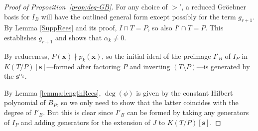 \documentclass[fleqn,reqno]{amsart}
\numberwithin{first}{chapter}
\begin{document}
\begin{proof}[Proof of Proposition~\ref{prop:deg-GB}]
For any choice of $>'$, a reduced Gr\"oebner basis for $I_B$ will have the outlined general form
except possibly for the term $g_{r+1}$. By Lemma \ref{SuppRees} and its proof, $I\cap T=P$, so also
$I'\cap T=P$. This establishes $g_{r+1}$ and shows that $\alpha_k\neq0$.

By reduceness, $P(\mathbf x)\nmid p_k(\mathbf x)$, so the initial ideal of the preimage $I'_B$ of $I_P$
in $K(T/P)[\mathbf s]$---formed after factoring
$P$ and inverting $(T\setminus P)$---is generated by the $\mathbf s^{\alpha_k}$.

By Lemma \ref{lemma:lengthRees}, $\deg(\phi)$ is given by the constant Hilbert polynomial of $B_P$,
so we only need to show that the latter coincides with the degree of $I'_B$.
But this is clear since $I'_B$ can be formed by taking any generators of $I_P$
and adding generators for the extension of $J$ to $K(T/P)[\mathbf s]$.
%
%
%
\end{proof}





\end{document}
